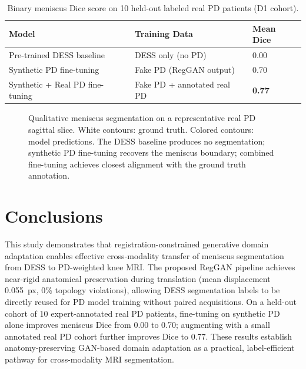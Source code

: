 \documentclass[12pt, a4paper]{article}
\begin{document}
\begin{table}[h]
\centering
\caption{Binary meniscus Dice score on 10 held-out labeled real PD patients (D1 cohort).}
\label{tab:results}
\begin{tabular}{lll}
\toprule
\textbf{Model} & \textbf{Training Data} & \textbf{Mean Dice} \\
\midrule
Pre-trained DESS baseline     & DESS only (no PD)               & 0.00  \\
Synthetic PD fine-tuning      & Fake PD (RegGAN output)         & 0.70  \\
Synthetic + Real PD fine-tuning & Fake PD + annotated real PD  & \textbf{0.77}  \\
\bottomrule
\end{tabular}
\end{table}

\begin{figure}[h]
    \centering
    \caption{Qualitative meniscus segmentation on a representative real PD sagittal slice. White contours: ground truth. Colored contours: model predictions. The DESS baseline produces no segmentation; synthetic PD fine-tuning recovers the meniscus boundary; combined fine-tuning achieves closest alignment with the ground truth annotation.}
    \label{fig:overlays}
\end{figure}

\section{Conclusions}

This study demonstrates that registration-constrained generative domain adaptation enables effective cross-modality transfer of meniscus segmentation from DESS to PD-weighted knee MRI. The proposed RegGAN pipeline achieves near-rigid anatomical preservation during translation (mean displacement 0.055~px, 0\% topology violations), allowing DESS segmentation labels to be directly reused for PD model training without paired acquisitions. On a held-out cohort of 10 expert-annotated real PD patients, fine-tuning on synthetic PD alone improves meniscus Dice from 0.00 to 0.70; augmenting with a small annotated real PD cohort further improves Dice to 0.77. These results establish anatomy-preserving GAN-based domain adaptation as a practical, label-efficient pathway for cross-modality MRI segmentation.
\end{document}
